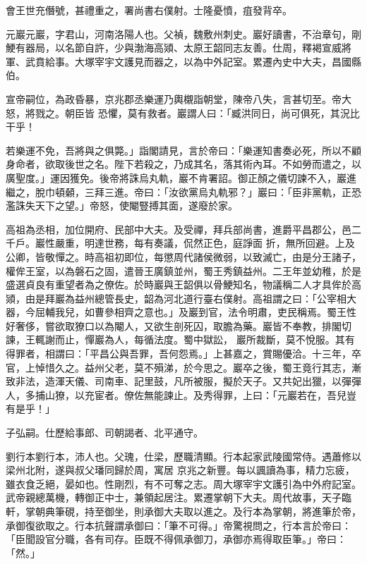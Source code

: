 \begin{pinyinscope}
 會王世充僭號，甚禮重之，署尚書右僕射。士隆憂憤，疽發背卒。



 元巖元巖，字君山，河南洛陽人也。父禎，魏敷州刺史。巖好讀書，不治章句，剛鯁有器局，以名節自許，少與渤海高熲、太原王韶同志友善。仕周，釋褐宣威將軍、武賁給事。大塚宰宇文護見而器之，以為中外記室。累遷內史中大夫，昌國縣伯。



 宣帝嗣位，為政昏暴，京兆郡丞樂運乃輿櫬詣朝堂，陳帝八失，言甚切至。帝大怒，將戮之。朝臣皆
 恐懼，莫有救者。巖謂人曰：「臧洪同日，尚可俱死，其況比干乎！



 若樂運不免，吾將與之俱斃。」詣閣請見，言於帝曰：「樂運知書奏必死，所以不顧身命者，欲取後世之名。陛下若殺之，乃成其名，落其術內耳。不如勞而遣之，以廣聖度。」運因獲免。後帝將誅烏丸軌，巖不肯署詔。御正顏之儀切諫不入，巖進繼之，脫巾頓顙，三拜三進。帝曰：「汝欲黨烏丸軌邪？」巖曰：「臣非黨軌，正恐濫誅失天下之望。」帝怒，使閹豎搏其面，遂廢於家。



 高祖為丞相，加位開府、民部中大夫。及受禪，拜兵部尚書，進爵平昌郡公，邑二千戶。巖性嚴重，明達世務，每有奏議，侃然正色，庭諍面
 折，無所回避。上及公卿，皆敬憚之。時高祖初即位，每懲周代諸侯微弱，以致滅亡，由是分王諸子，權侔王室，以為磐石之固，遣晉王廣鎮並州，蜀王秀鎮益州。二王年並幼稚，於是盛選貞良有重望者為之僚佐。於時巖與王韶俱以骨鯁知名，物議稱二人才具侔於高熲，由是拜巖為益州總管長史，韶為河北道行臺右僕射。高祖謂之曰：「公宰相大器，今屈輔我兒，如曹參相齊之意也。」及巖到官，法令明肅，吏民稱焉。蜀王性好奢侈，嘗欲取獠口以為閹人，又欲生剖死囚，取膽為藥。巖皆不奉教，排閣切諫，王輒謝而止，憚巖為人，每循法度。蜀中獄訟，
 巖所裁斷，莫不悅服。其有得罪者，相謂曰：「平昌公與吾罪，吾何怨焉。」上甚嘉之，賞賜優洽。十三年，卒官，上悼惜久之。益州父老，莫不殞涕，於今思之。巖卒之後，蜀王竟行其志，漸致非法，造渾天儀、司南車、記里鼓，凡所被服，擬於天子。又共妃出獵，以彈彈人，多捕山獠，以充宦者。僚佐無能諫止。及秀得罪，上曰：「元巖若在，吾兒豈有是乎！」



 子弘嗣。仕歷給事郎、司朝謁者、北平通守。



 劉行本劉行本，沛人也。父瑰，仕梁，歷職清顯。行本起家武陵國常侍。遇蕭修以梁州北附，遂與叔父璠同歸於周，寓居
 京兆之新豐。每以諷讀為事，精力忘疲，雖衣食乏絕，晏如也。性剛烈，有不可奪之志。周大塚宰宇文護引為中外府記室。武帝親總萬機，轉御正中士，兼領起居注。累遷掌朝下大夫。周代故事，天子臨軒，掌朝典筆硯，持至御坐，則承御大夫取以進之。及行本為掌朝，將進筆於帝，承御復欲取之。行本抗聲謂承御曰：「筆不可得。」帝驚視問之，行本言於帝曰：「臣聞設官分職，各有司存。臣既不得佩承御刀，承御亦焉得取臣筆。」帝曰：「然。」




\end{pinyinscope}
